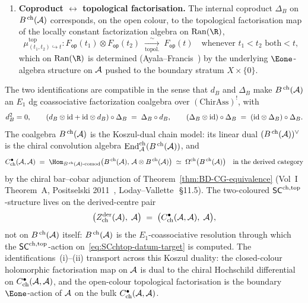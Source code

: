\begin{theorem}[Bar differential = holomorphic factorisation,
coproduct = topological factorisation;
\ClaimStatusProvedHere]
\begin{enumerate}[label=\textup{(\roman*)}]
\item \textbf{Coproduct $\leftrightarrow$ topological factorisation.}
The internal coproduct $\Delta_B$ on $B^{\,\mathrm{ch}}(\mathcal{A})$
corresponds, on the open colour, to the topological factorisation
map of the locally constant factorization algebra on $\Ran(\R)$,
\begin{equation}\label{eq:top-fact-map}
 \mu^{\mathrm{top}}_{(t_1,t_2)\hookrightarrow t}\colon
 F_{\mathsf{op}}(t_1)\otimes F_{\mathsf{op}}(t_2)
 \;\xrightarrow[\text{topol.}]{\sim}\;
 F_{\mathsf{op}}(t)\quad\text{whenever } t_1<t_2 \text{ both} <t,
\end{equation}
which on $\Ran(\R)$ is determined (Ayala--Francis~\cite{AF15}) by the
underlying $\Eone$-algebra structure on $\mathcal{A}$ pushed to the boundary
stratum $X\times\{0\}$.
\end{enumerate}
The two identifications are compatible in the sense that
$d_B$ and $\Delta_B$ make $B^{\,\mathrm{ch}}(\mathcal{A})$ an $E_1$ dg
coassociative factorization coalgebra over
$(\mathrm{ChirAss})^!$, with
\begin{equation}\label{eq:bar-coalg-mc}
 d_B^2 = 0,\qquad
 (d_B\otimes\mathrm{id}+\mathrm{id}\otimes d_B)\circ\Delta_B
 \;=\;
 \Delta_B\circ d_B,\qquad
 (\Delta_B\otimes\mathrm{id})\circ\Delta_B
 \;=\;
 (\mathrm{id}\otimes\Delta_B)\circ\Delta_B.
\end{equation}
The coalgebra $B^{\,\mathrm{ch}}(\mathcal{A})$ is the Koszul-dual chain
model: its linear dual
$(B^{\,\mathrm{ch}}(\mathcal{A}))^{\vee}$
is the chiral convolution algebra
$\mathrm{End}^{\mathrm{ch}}_{\mathcal{A}}(B^{\,\mathrm{ch}}(\mathcal{A}))$, and
\begin{equation}\label{eq:bar-koszul-dual-chain}
 C^{\bullet}_{\mathrm{ch}}(\cA,\cA)
 \;=\;
 \Hom_{B^{\,\mathrm{ch}}(\cA)\text{-comod}}
 \bigl(B^{\,\mathrm{ch}}(\cA),\,\cA\otimes B^{\,\mathrm{ch}}(\cA)\bigr)
 \;\simeq\;
 \Omega^{\mathrm{ch}}\bigl(B^{\,\mathrm{ch}}(\cA)\bigr)
 \quad\text{in the derived category}
\end{equation}
by the chiral bar--cobar adjunction of
Theorem~\ref{thm:BD-CG-equivalence} (Vol~I Theorem~A, Positselski
2011~\cite{Positselski11}, Loday--Vallette~\cite{LV12}\,\S11.5).
The two-coloured $\mathsf{SC}^{\mathrm{ch},\mathrm{top}}$-structure lives on the derived-centre
pair
\begin{equation}\label{eq:SCchtop-datum-target}
 \bigl(Z^{\mathrm{der}}_{\mathrm{ch}}(\mathcal{A}),\;\mathcal{A}\bigr)
 \;=\;
 \bigl(C^{\bullet}_{\mathrm{ch}}(\mathcal{A},\mathcal{A}),\;\mathcal{A}\bigr),
\end{equation}
not on $B^{\,\mathrm{ch}}(\mathcal{A})$ itself: $B^{\,\mathrm{ch}}(\mathcal{A})$
is the $E_1$-coassociative resolution through which the
$\mathsf{SC}^{\mathrm{ch},\mathrm{top}}$-action on~\eqref{eq:SCchtop-datum-target} is
computed. The identifications~(i)--(ii) transport across this
Koszul duality: the closed-colour holomorphic factorisation map
on $\mathcal{A}$ is dual to the chiral Hochschild differential on
$C^{\bullet}_{\mathrm{ch}}(\mathcal{A},\mathcal{A})$, and the open-colour
topological factorisation is the boundary $\Eone$-action of
$\mathcal{A}$ on the bulk $C^{\bullet}_{\mathrm{ch}}(\mathcal{A},\mathcal{A})$.
\end{theorem}

